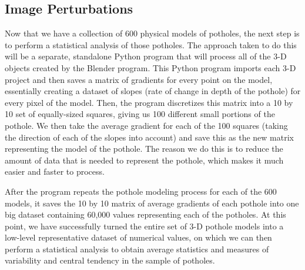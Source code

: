 \documentclass{article}
\begin{document}
\subsection{Image Perturbations}

Now that we have a collection of 600 physical models of potholes, the next step is to perform a statistical analysis of those potholes. The approach taken to do this will be a separate, standalone Python program that will process all of the 3-D objects created by the Blender program. This Python program imports each 3-D project and then saves a matrix of gradients for every point on the model, essentially creating a dataset of slopes (rate of change in depth of the pothole) for every pixel of the model. Then, the program discretizes this matrix into a 10 by 10 set of equally-sized squares, giving us 100 different small portions of the pothole. We then take the average gradient for each of the 100 squares (taking the direction of each of the slopes into account) and save this as the new matrix representing the model of the pothole. The reason we do this is to reduce the amount of data that is needed to represent the pothole, which makes it much easier and faster to process.

After the program repeats the pothole modeling process for each of the 600 models, it saves the 10 by 10 matrix of average gradients of each pothole into one big dataset containing 60,000 values representing each of the potholes. At this point, we have successfully turned the entire set of 3-D pothole models into a low-level representative dataset of numerical values, on which we can then perform a statistical analysis to obtain average statistics and measures of variability and central tendency in the sample of potholes.
\end{document}
